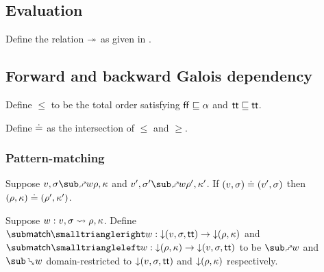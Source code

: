\subsection{Evaluation}




\begin{definition}
   \label{def:core-language:closeDefs}
   Define the relation $\twoheadrightarrow$ as given in .
\end{definition}

\subsection{Forward and backward Galois dependency}



\begin{definition}
   Define $\leq$ to be the total order satisfying $\mathsf{ff} \sqsubseteq \alpha$ and $\mathsf{tt} \sqsubseteq \mathsf{tt}$.
\end{definition}

\begin{definition}
   Define $\doteq$ as the intersection of $\leq$ and $\geq$.
\end{definition}




\subsubsection{Pattern-matching}




\begin{lemma}
   Suppose $v, \sigma \matchFwdR{w} \rho, \kappa$ and $v', \sigma' \matchFwdR{w} \rho', \kappa'$. If $(v, \sigma) \doteq (v', \sigma)$ then $(\rho, \kappa) \doteq (\rho', \kappa')$.
\end{lemma}

\begin{definition}
   Suppose $w: v, \sigma \rightsquigarrow \rho, \kappa$. Define $\matchFwdF{w}: \Below{(v,\sigma,\TT)} \to \Below{(\rho,\kappa)}$ and $\matchBwdF{w}: \Below{(\rho,\kappa)} \to \Below{(v,\sigma,\TT)}$ to be $\matchFwdR{w}$ and $\matchBwdR{w}$ domain-restricted to ${\downarrow}{(v,\sigma,\mathsf{tt})}$ and ${\downarrow}{(\rho,\kappa)}$ respectively.
\end{definition}

